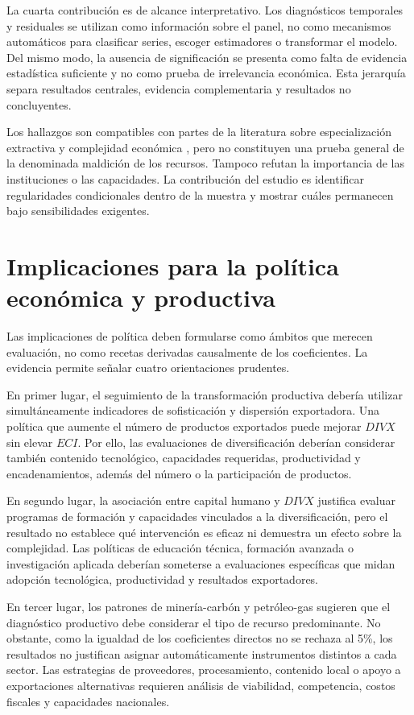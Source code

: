 \documentclass[../../TFM.tex]{subfiles}
\begin{document}
La cuarta contribución es de alcance interpretativo. Los diagnósticos temporales
y residuales se utilizan como información sobre el panel, no como mecanismos
automáticos para clasificar series, escoger estimadores o transformar el modelo.
Del mismo modo, la ausencia de significación se presenta como falta de evidencia
estadística suficiente y no como prueba de irrelevancia económica. Esta
jerarquía separa resultados centrales, evidencia complementaria y resultados no
concluyentes.

Los hallazgos son compatibles con partes de la literatura sobre especialización
extractiva y complejidad económica \parencite{Auty1993,Sachs1995,Hidalgo2009,Hausmann2014},
pero no constituyen una prueba general de la denominada maldición de los
recursos. Tampoco refutan la importancia de las instituciones o las capacidades.
La contribución del estudio es identificar regularidades condicionales dentro de
la muestra y mostrar cuáles permanecen bajo sensibilidades exigentes.


\section{Implicaciones para la política económica y productiva}
\label{sec:recomendaciones-politica}

Las implicaciones de política deben formularse como ámbitos que merecen
evaluación, no como recetas derivadas causalmente de los coeficientes. La
evidencia permite señalar cuatro orientaciones prudentes.

En primer lugar, el seguimiento de la transformación productiva debería utilizar
simultáneamente indicadores de sofisticación y dispersión exportadora. Una
política que aumente el número de productos exportados puede mejorar $DIVX$ sin
elevar $ECI$. Por ello, las evaluaciones de diversificación deberían considerar
también contenido tecnológico, capacidades requeridas, productividad y
encadenamientos, además del número o la participación de productos.

En segundo lugar, la asociación entre capital humano y $DIVX$ justifica evaluar
programas de formación y capacidades vinculados a la diversificación, pero el
resultado no establece qué intervención es eficaz ni demuestra un efecto sobre
la complejidad. Las políticas de educación técnica, formación avanzada o
investigación aplicada deberían someterse a evaluaciones específicas que midan
adopción tecnológica, productividad y resultados exportadores.

En tercer lugar, los patrones de minería-carbón y petróleo-gas sugieren que el
diagnóstico productivo debe considerar el tipo de recurso predominante. No
obstante, como la igualdad de los coeficientes directos no se rechaza al 5\%, los
resultados no justifican asignar automáticamente instrumentos distintos a cada
sector. Las estrategias de proveedores, procesamiento, contenido local o apoyo
a exportaciones alternativas requieren análisis de viabilidad, competencia,
costos fiscales y capacidades nacionales.
\end{document}

